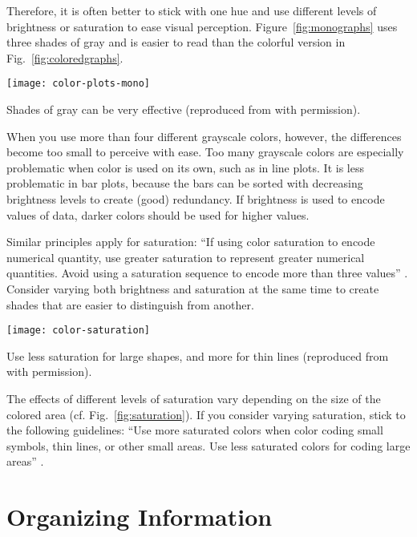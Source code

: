 Therefore, it is often better to stick with one hue and use different levels of brightness or saturation to ease visual perception. Figure~\ref{fig:monographs} uses three shades of gray and is easier to read than the colorful version in Fig.~\ref{fig:coloredgraphs}.


\begin{marginfigure}
\centering
\texttt{[image: color-plots-mono]}
\caption{\label{fig:monographs} Shades of gray can be very effective (reproduced from \cite{Carter12} with permission).}%
\end{marginfigure}

When you use more than four different grayscale colors, however, the differences become too small to perceive with ease. Too many grayscale colors are especially problematic when color is used on its own, such as in line plots. It is less problematic in bar plots, because the bars can be sorted with decreasing brightness levels to create (good) redundancy. If brightness is used to encode values of data, darker colors should be used for higher values.

Similar principles apply for saturation: ``If using color saturation to encode numerical quantity, use greater saturation to represent greater numerical quantities. Avoid using a saturation sequence to encode more than three values'' \cite{Ware12}. Consider varying both brightness and saturation at the same time to create shades that are easier to distinguish from another.

\begin{marginfigure}
\centering
\texttt{[image: color-saturation]}
\caption{\label{fig:saturation} Use less saturation for large shapes, and more for thin lines (reproduced from \cite{Ware12} with permission).}%
\end{marginfigure}

The effects of different levels of saturation vary depending on the size of the colored area (cf. Fig.~\ref{fig:saturation}). If you consider varying saturation, stick to the following guidelines: ``Use more saturated colors when color coding small symbols, thin lines, or other small areas. Use less saturated colors for coding large areas'' \cite{Ware12}.


\section{Organizing Information}
\label{sec:organizinginfo}


